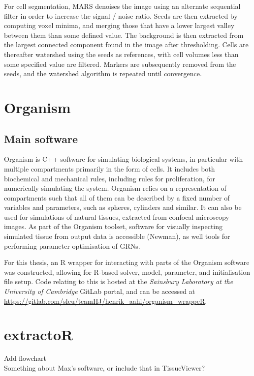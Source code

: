 For cell segmentation, MARS denoises the image using an alternate sequential filter in
order to increase the signal / noise ratio. Seeds are then extracted by
computing voxel minima, and merging those that have a lower largest valley
between them than some defined value. The background is then extracted from the
largest connected component found in the image after thresholding. Cells are
thereafter watershed using the seeds as references, with cell volumes less than
some specified value are filtered. Markers are subsequently removed from the
seeds, and the watershed algorithm is repeated until convergence. \CITE

\section{Organism}
\subsection{Main software}
Organism is C++ software for simulating biological systems, in particular with
multiple compartments primarily in the form of cells. It includes both
biochemical and mechanical rules, including rules for proliferation, for
numerically simulating the system. Organism relies on a representation of
compartments such that all of them can be described by a fixed number of
variables and parameters, such as spheres, cylinders and similar. It can also be
used for simulations of natural tissues, extracted from confocal microscopy
images. As part of the Organism toolset, software for visually inspecting
simulated tissue from output data is accessible (Newman), as well tools for
performing parameter optimisation of GRNs. \CITE

For this thesis, an R wrapper for interacting with parts of the Organism software was
constructed, allowing for R-based solver, model, parameter, and initialisation file setup.
Code relating to this is hosted at the \textit{Sainsbury Laboratory at the University of
  Cambridge} GitLab portal, and can be accessed at 
\url{https://gitlab.com/slcu/teamHJ/henrik_aahl/organism_wrappeR}.

\section{extractoR}
Add flowchart \\[3cm]

Something about Max's software, or include that in TissueViewer?

